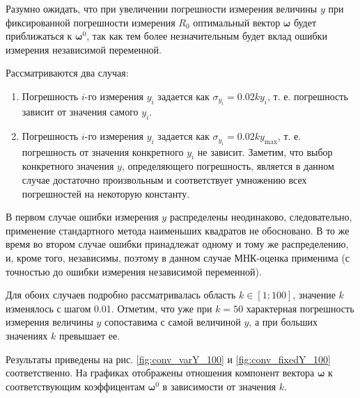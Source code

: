 \documentclass[tikz,11pt,a4paper]{article}
\begin{document}
Разумно ожидать, что при увеличении погрешности измерения величины $y$ при
фиксированной погрешности измерения $R_0$ оптимальный вектор $\boldsymbol{\omega}$
будет приближаться к $\boldsymbol{\omega}^0$, так как тем более незначительным
будет вклад ошибки измерения независимой переменной.

Рассматриваются два случая:
\begin{enumerate}
  \item Погрешность $i$-го измерения $y_i$ задается как $\sigma_{y_i} = 0.02ky_i$, т. е.
	погрешность зависит от значения самого $y_i$.
  \item Погрешность $i$-го измерения $y_i$ задается как $\sigma_{y_i} = 0.02ky_{\max}$,
	т. е. погрешность от значения конкретного $y_i$ не зависит. Заметим, что выбор
	конкретного значения $y$, определяющего погрешность, является в данном случае
	достаточно произвольным и соответствует умножению всех погрешностей на некоторую константу.
\end{enumerate}

В первом случае ошибки измерения $y$ распределены неодинаково, следовательно, применение
стандартного метода наименьших квадратов не обосновано. В то же время во втором случае
ошибки принадлежат одному и тому же распределению, и, кроме того, независимы, поэтому
в данном случае МНК-оценка применима (с точностью до ошибки измерения независимой
переменной).

Для обоих случаев подробно рассматривалась область $k \in [1; 100]$, значение $k$
изменялось с шагом 0.01. Отметим, что уже при $k = 50$ характерная погрешность
измерения величины $y$ сопоставима с самой величиной $y$, а при больших значениях
$k$ превышает ее.

Результаты приведены на рис. \ref{fig:conv_varY_100} и \ref{fig:conv_fixedY_100}
соответственно. На графиках отображены отношения компонент вектора $\boldsymbol{\omega}$ к
соответствующим коэффицентам $\boldsymbol{\omega}^0$ в зависимости от значения $k$.
\end{document}
